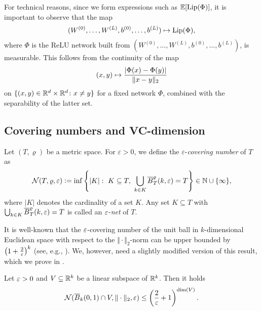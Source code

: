 For technical reasons, since we form expressions such as
$\mathbb{E} [\operatorname{Lip} (\Phi)]$, it is important to observe that the map
\begin{equation*}
  (W^{(0)}, \dots, W^{(L)}, b^{(0)}, \dots, b^{(L)}) \mapsto \operatorname{Lip}(\Phi),
\end{equation*}
where $\Phi$ is the ReLU network built from $(W^{(0)}, \dots, W^{(L)}, b^{(0)}, \dots, b^{(L)})$,
is measurable.
This follows from the continuity of the map
\begin{equation*}
  (x,y) \mapsto \frac{\left\lvert \Phi(x) - \Phi(y)\right\rvert }{\Vert x - y \Vert_2}
\end{equation*}
on $\{ (x,y) \in \mathbb{R}^{d} \times \mathbb{R}^d \colon x \neq y \}$ for a fixed network $\Phi$,
combined with the separability of the latter set.

\subsection{Covering numbers and VC-dimension}

Let $(T, \varrho)$ be a metric space.
For $\varepsilon > 0$, we define the $\varepsilon$-\emph{covering number} of $T$ as
\begin{equation*}
  \mathcal{N}(T,\varrho,\varepsilon)
  \mathrel{\mathop:}= \inf
         \left\{
           \vert K \vert : \ K \subseteq T, \ \bigcup_{k \in K} \overline{B}^\varrho_T(k,\varepsilon) = T
         \right\}
   \in   \mathbb{N} \cup \{\infty\},
\end{equation*} 
where $\vert K\vert$ denotes the cardinality of a set $K$.
Any set $K \subseteq T$ with $\bigcup_{k \in K} \overline{B}^\varrho_T(k,\varepsilon) = T$
is called an $\varepsilon$-\emph{net} of $T$.


It is well-known that the $\varepsilon$-covering number of the unit ball in $k$-dimensional Euclidean space 
with respect to the $\Vert \cdot \Vert_2$-norm can be upper bounded by $\left(1 + \frac{2}{\varepsilon}\right)^k$ (see, e.g., \cite[Corollary 4.2.13]{vershynin_high-dimensional_2018}). 
We, however, need a slightly modified version of this result, which we prove in .
\begin{proposition}\label{prop:covering_ball}
  Let $\varepsilon>0$ and $V \subseteq \mathbb{R}^k$ be a linear subspace of $\mathbb{R}^k$.
  Then it holds 
  \begin{equation*}
    \mathcal{N}(\overline{B}_k(0,1) \cap V, \Vert \cdot \Vert_2, \varepsilon) \leq \left(\frac{2}{\varepsilon} + 1\right)^{\dim(V)}.
  \end{equation*}
\end{proposition}

